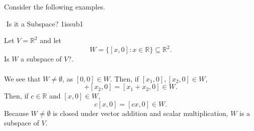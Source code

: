        \pagebreak
        \vphantom
        \\
        \\
        Consider the following examples.
        \begin{example}{\Difficulty\,\,Is it a Subspace? 1}{issub1}

            Let \(V=\mathbb{R}^2\) and let 
            \begin{equation*}
                W=\{[x,0]:x\in\mathbb{R}\}\subseteq \mathbb{R}^2.
            \end{equation*}
            Is \(W\) a subspace of \(V\)?.
            \\
            \\
            We see that \(W\neq\emptyset\), as \([0,0]\in W\). Then, if \([x_1,0],[x_2,0]\in W\),
            \begin{equation*}
                [x_1,0]+[x_2,0]=[x_1+x_2,0]\in W.
            \end{equation*}
            Then, if \(c\in\mathbb{R}\) and \([x,0]\in W\),
            \begin{equation*}
                c[x,0]=[cx,0]\in W.
            \end{equation*}
            Because \(W\neq\emptyset\) is closed under vector addition and scalar multiplication, \(W\) is a subspace of \(V\).

        \end{example}
